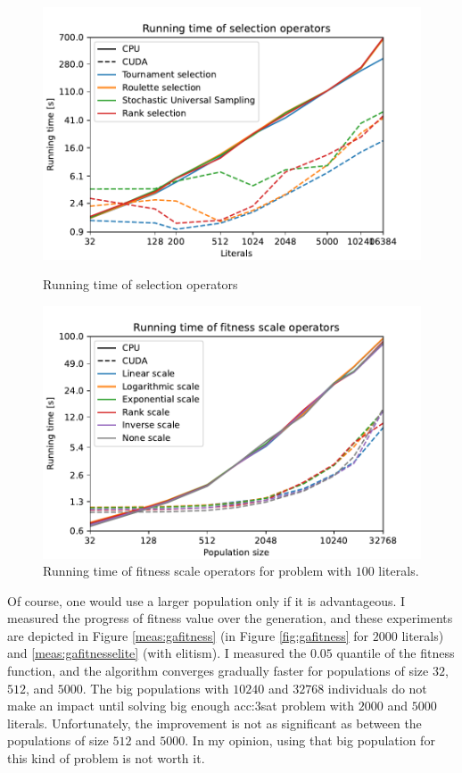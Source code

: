\begin{figure}
    \begin{minipage}[t]{0.48\textwidth}
        \includegraphics[width=\textwidth]{img/runs/time_ga_selections_with_legend.pdf}
        \caption{Running time of selection operators}
        \label{fig:selectiontime}
    \end{minipage}
    \hfill
    \begin{minipage}[t]{0.48\textwidth}
        \includegraphics[width=\textwidth]{img/runs/time_ga_scale_100l_with_legend.pdf}
        \caption[Running time of fitness scale operators]{Running time of fitness scale operators for problem with $100$ literals.}
        \label{fig:gafitnessscaletime}
    \end{minipage}
\end{figure}


Of course, one would use a larger population only if it is advantageous. I measured the progress of fitness value over the generation, and these experiments are depicted in Figure \ref{meas:gafitness} (in Figure \ref{fig:gafitness} for $2000$ literals) and \ref{meas:gafitnesselite} (with elitism). I measured the $0.05$ quantile of the fitness function, and the algorithm converges gradually faster for populations of size $32$, $512$, and $5000$. The big populations with $10240$ and $32768$ individuals do not make an impact until solving big enough \acrshort{acc:3sat} problem with $2000$ and $5000$ literals. Unfortunately, the improvement is not as significant as between the populations of size $512$ and $5000$. In my opinion, using that big population for this kind of problem is not worth it.

